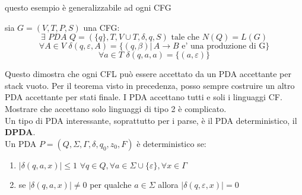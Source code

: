 \documentclass[a4paper,12pt, oneside]{book}
\begin{document}
	questo esempio è generalizzabile ad ogni CFG


	\begin{teorema}
		sia $G=(V,T,P,S)$ una CFG:
		$$\exists\,\, PDA\,\,Q=(\{q\},T,V\cup T,\delta,q,S)\mbox{ tale che }N(Q)=L(G)$$
		$$\forall A\in V\,\,\delta(q,\varepsilon,A)=\{(q,\beta)|\,A\to B\mbox{ e' una produzione di G}\}$$
		$$\forall a\in T\,\,\delta(q,a,a)=\{(a,\varepsilon)\}$$
	\end{teorema}
	Questo dimostra che ogni CFL può essere accettato da un PDA accettante per stack vuoto. Per il teorema visto in precedenza, posso sempre costruire un altro PDA accettante per stati finale. I PDA accettano tutti e soli i linguaggi CF. Mostrare che accettano solo linguaggi di tipo 2 è complicato.\\
	Un tipo di PDA interessante, soprattutto per i parse, è il PDA deterministico, il \textbf{DPDA}.\\
	Un PDA $P=(Q,\Sigma,\Gamma,\delta,q_0,z_0,F)$ è deterministico se:
	\begin{enumerate}
		\item $|\delta(q,a,x)|\leq 1$ $\forall q\in Q,\forall a\in\Sigma\cup\{\varepsilon\},\forall x\in \Gamma$
		\item se $|\delta(q,a,x)|\neq 0$ per qualche $a\in \Sigma$ allora $|\delta(q,\varepsilon,x)|=0$
	\end{enumerate}
\end{document}
